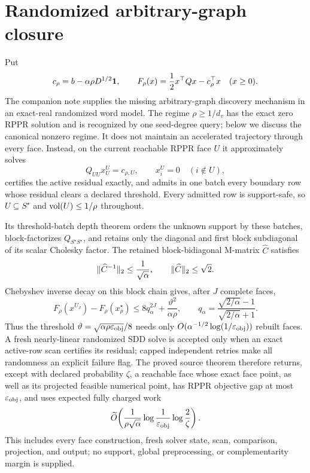 \section{Randomized arbitrary-graph closure}
\label{sec:random-core}

Put
\begin{equation*}
 c_\rho=b-\alpha\rho D^{1/2}\mathbf{1},
 \qquad
 F_\rho(x)=\frac12x^\top Qx-c_\rho^\top x
 \quad(x\geq0).
\end{equation*}
The companion  note supplies the missing
arbitrary-graph discovery mechanism in an exact-real randomized word model.
The regime $\rho\geq1/d_v$ has the exact zero RPPR solution and is recognized
by one seed-degree query; below we discuss the canonical nonzero regime.
It does not maintain an accelerated trajectory through every face.  Instead,
on the current reachable RPPR face $U$ it approximately solves
\begin{equation}
 Q_{UU}x_U^U=c_{\rho,U},
 \qquad x_i^U=0\quad(i\notin U),
 \label{eq:random-core-face}
\end{equation}
certifies the active residual exactly, and admits in one batch every boundary
row whose residual clears a declared threshold.  Every admitted row is
support-safe, so $U\subseteq S^\star$ and $\operatorname{vol}(U)\leq1/\rho$ throughout.

Its threshold-batch depth theorem orders the unknown support by these batches,
block-factorizes $Q_{S^\star S^\star}$, and retains only the diagonal and
first block subdiagonal of its scalar Cholesky factor.  The retained
block-bidiagonal M-matrix $\widehat C$ satisfies
\begin{equation}
 \lVert\widehat C^{-1}\rVert_2\leq\frac1{\sqrt\alpha},
 \qquad \lVert\widehat C\rVert_2\leq\sqrt2.
 \label{eq:random-core-conditioning}
\end{equation}
Chebyshev inverse decay on this block chain gives, after $J$ complete faces,
\begin{equation}
 F_\rho(x^{U_J})-F_\rho(x_\rho^\star)
 \leq 8q_\alpha^{2J}+\frac{\vartheta^2}{\alpha\rho},
 \qquad
 q_\alpha=\frac{\sqrt{2/\alpha}-1}{\sqrt{2/\alpha}+1}.
 \label{eq:random-core-depth}
\end{equation}
Thus the threshold
$\vartheta=\sqrt{\alpha\rho\varepsilon_{\rm obj}}/8$ needs only
$O(\alpha^{-1/2}\log(1/\varepsilon_{\rm obj}))$ rebuilt faces.  A fresh
nearly-linear randomized SDD solve \citep{koutis2011nearly} is accepted only
when an exact active-row scan certifies its residual; capped independent
retries make all randomness an explicit failure flag.  The proved source
theorem therefore returns, except with declared probability $\zeta$, a
reachable face whose exact face point, as well as its projected feasible
numerical point, has RPPR objective gap at most
$\varepsilon_{\rm obj}$, and uses
expected fully charged work
\begin{equation}
 \widetilde O\!\left(
  \frac{1}{\rho\sqrt\alpha}
  \log\frac1{\varepsilon_{\rm obj}}
  \log\frac2\zeta
 \right).
 \label{eq:random-core-source-work}
\end{equation}
This includes every face construction, fresh solver state, scan, comparison,
projection, and output; no support, global preprocessing, or complementarity
margin is supplied.

